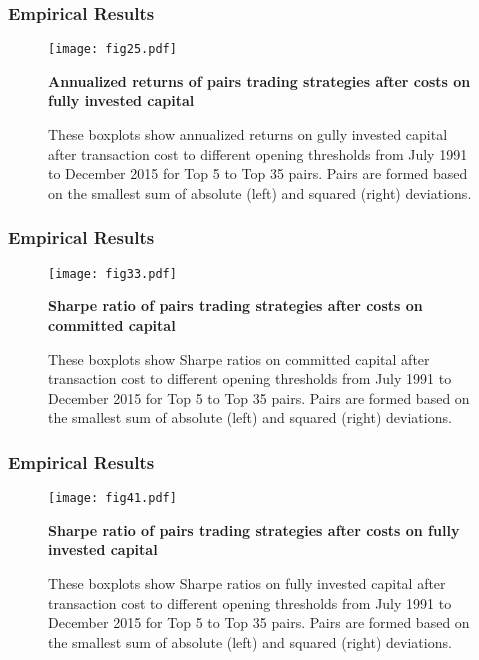 \documentclass[pdf,9pt,xcolor=dvipsnames,hide notes]{beamer}
\begin{document}
\begin{frame}
	\frametitle{Empirical Results}
	
	\begin{figure}[H]
		\centering
		\texttt{[image: fig25.pdf]}
		\caption{\textbf{Annualized returns of pairs trading strategies after costs on fully invested capital}}
		\caption*{\tiny These boxplots show annualized returns on gully invested capital after transaction cost to different opening thresholds from July 1991 to December 2015 for Top 5 to Top 35 pairs. Pairs are formed based on the smallest sum of absolute (left) and squared (right) deviations.}
		\label{fig:fig25}
	\end{figure}
	
\end{frame}
%
\begin{frame}
	\frametitle{Empirical Results}
	
	\begin{figure}[H]
		\centering
		\texttt{[image: fig33.pdf]}
		\caption{\textbf{Sharpe ratio of pairs trading strategies after costs on committed capital}}
		\caption*{\justifying \tiny These boxplots show Sharpe ratios on committed capital after transaction cost to different opening thresholds from July 1991 to December 2015 for Top 5 to Top 35 pairs. Pairs are formed based on the smallest sum of absolute (left) and squared (right) deviations.}
		\label{fig:fig33}
	\end{figure}
	
\end{frame}

\begin{frame}
	\frametitle{Empirical Results}
	
	\begin{figure}[H]
		\centering \tiny
		\texttt{[image: fig41.pdf]}
		\caption{\textbf {Sharpe ratio of pairs trading strategies after costs on fully invested capital}}
		\caption*{\justifying \tiny These boxplots show Sharpe ratios on fully invested capital after transaction cost to different opening thresholds from July 1991 to December 2015 for Top 5 to Top 35 pairs. Pairs are formed based on the smallest sum of absolute (left) and squared (right) deviations.}
		\label{fig:fig42}
	\end{figure}
	
\end{frame}
\end{document}
